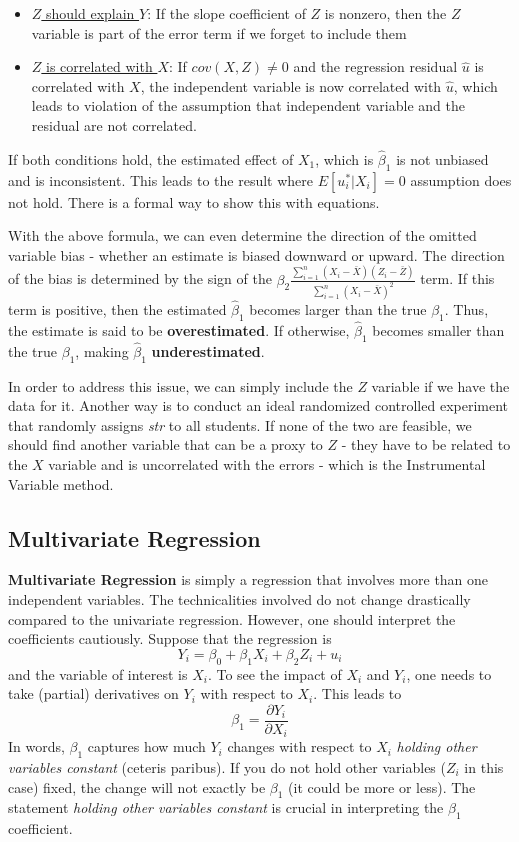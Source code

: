 \documentclass[12pt]{article}
\theoremstyle{definition}
\theoremstyle{property}
\theoremstyle{assumption}
\theoremstyle{example}
\theoremstyle{comment}
\begin{document}
\begin{itemize}
\item \underline{$Z$ should explain $Y$}: If the slope coefficient of $Z$ is nonzero, then the $Z$ variable is part of the error term if we forget to include them
\item \underline{$Z$ is correlated with $X$}: If $cov(X,Z)\neq0$ and the regression residual $\hat{u}$ is correlated with $X$, the independent variable is now correlated with $\hat{u}$, which leads to violation of the assumption that independent variable and the residual are not correlated.
\end{itemize} \par\medskip
If both conditions hold, the estimated effect of $X_1$, which is $\hat{\beta}_1$ is not unbiased and is inconsistent. This leads to the result where $E[u^*_i|X_i]=0$ assumption does not hold. There is a formal way to show this with equations.
\par\medskip
With the above formula, we can even determine the direction of the omitted variable bias - whether an estimate is biased downward or upward. The direction of the bias is determined by the sign of the $\beta_2\frac{\sum_{i=1}^n(X_i-\bar{X})(Z_i-\bar{Z})}{\sum_{i=1}^n(X_i-\bar{X})^2}$ term. If this term is positive, then the estimated $\hat{\beta}_1$ becomes larger than the true $\beta_1$. Thus, the estimate is said to be \textbf{overestimated}. If otherwise, $\hat{\beta}_1$ becomes smaller than the true $\beta_1$, making $\hat{\beta}_1$ \textbf{underestimated}.
\par\medskip
In order to address this issue, we can simply include the $Z$ variable if we have the data for it. Another way is to conduct an ideal randomized controlled experiment that randomly assigns \textit{str} to all students. If none of the two are feasible, we should find another variable that can be a proxy to $Z$ - they have to be related to the $X$ variable and is uncorrelated with the errors - which is the Instrumental Variable method. \par\medskip

\subsection{Multivariate Regression}
\textbf{Multivariate Regression} is simply a regression that involves more than one independent variables. The technicalities involved do not change drastically compared to the univariate regression. However, one should interpret the coefficients cautiously. Suppose that the regression is
\[
Y_i = \beta_0 + \beta_1 X_i + \beta_2 Z_i+u_i
\]
and the variable of interest is $X_i$. To see the impact of $X_i$ and $Y_i$, one needs to take (partial) derivatives on $Y_i$ with respect to $X_i$. This leads to
\[
\beta_1 = \frac{\partial Y_i}{\partial X_i}
\]
In words, $\beta_1$ captures how much $Y_i$ changes with respect to $X_i$ \emph{holding other variables constant} (ceteris paribus). If you do not hold other variables ($Z_i$ in this case) fixed, the change will not exactly be $\beta_1$ (it could be more or less). The statement \emph{holding other variables constant} is crucial in interpreting the $\beta_1$ coefficient.
\par\medskip
\end{document}
